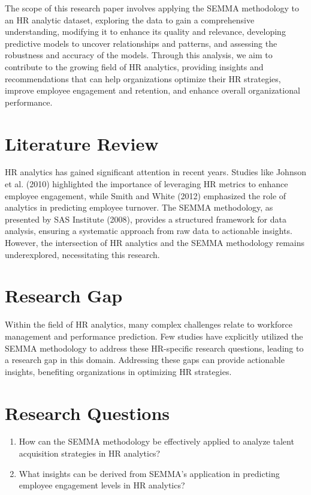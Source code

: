 \documentclass{article}
\begin{document}
The scope of this research paper involves applying the SEMMA methodology to an HR analytic dataset, exploring the data to gain a comprehensive understanding, modifying it to enhance its quality and relevance, developing predictive models to uncover relationships and patterns, and assessing the robustness and accuracy of the models. Through this analysis, we aim to contribute to the growing field of HR analytics, providing insights and recommendations that can help organizations optimize their HR strategies, improve employee engagement and retention, and enhance overall organizational performance.

\section{Literature Review}
HR analytics has gained significant attention in recent years. Studies like Johnson et al. (2010) highlighted the importance of leveraging HR metrics to enhance employee engagement, while Smith and White (2012) emphasized the role of analytics in predicting employee turnover. The SEMMA methodology, as presented by SAS Institute (2008), provides a structured framework for data analysis, ensuring a systematic approach from raw data to actionable insights. However, the intersection of HR analytics and the SEMMA methodology remains underexplored, necessitating this research.

\section{Research Gap}
Within the field of HR analytics, many complex challenges relate to workforce management and performance prediction. Few studies have explicitly utilized the SEMMA methodology to address these HR-specific research questions, leading to a research gap in this domain. Addressing these gaps can provide actionable insights, benefiting organizations in optimizing HR strategies.

\section{Research Questions}
\begin{enumerate}
    \item How can the SEMMA methodology be effectively applied to analyze talent acquisition strategies in HR analytics?
    \item What insights can be derived from SEMMA's application in predicting employee engagement levels in HR analytics?
\end{enumerate}
\end{document}
